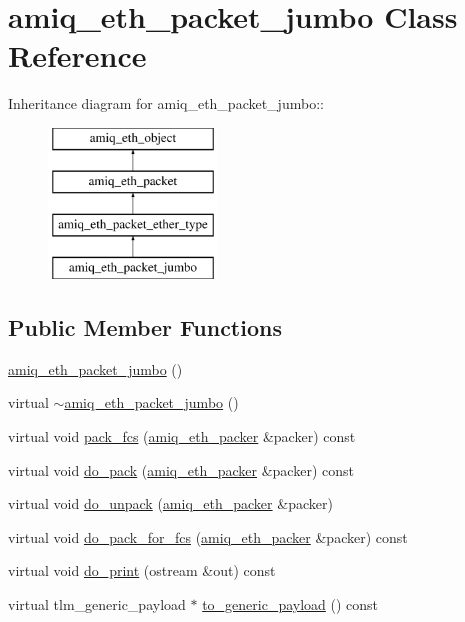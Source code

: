 \hypertarget{classamiq__eth__packet__jumbo}{
\section{amiq\_\-eth\_\-packet\_\-jumbo Class Reference}
\label{classamiq__eth__packet__jumbo}
}
Inheritance diagram for amiq\_\-eth\_\-packet\_\-jumbo::\begin{figure}[H]
\begin{center}
\leavevmode
\includegraphics[height=4cm]{classamiq__eth__packet__jumbo}
\end{center}
\end{figure}
\subsection*{Public Member Functions}
\begin{DoxyCompactItemize}
\item 
\hyperlink{classamiq__eth__packet__jumbo_a860096fdee8dda024573e33010090017}{amiq\_\-eth\_\-packet\_\-jumbo} ()
\item 
virtual \hyperlink{classamiq__eth__packet__jumbo_ad3d4e0fc8070e503c1848e18dd32eabc}{$\sim$amiq\_\-eth\_\-packet\_\-jumbo} ()
\item 
virtual void \hyperlink{classamiq__eth__packet__jumbo_ab53103b74f5b88bd563c647ef28b088e}{pack\_\-fcs} (\hyperlink{classamiq__eth__packer}{amiq\_\-eth\_\-packer} \&packer) const 
\item 
virtual void \hyperlink{classamiq__eth__packet__jumbo_a1f2906c7128a79c356e152368584d2e8}{do\_\-pack} (\hyperlink{classamiq__eth__packer}{amiq\_\-eth\_\-packer} \&packer) const 
\item 
virtual void \hyperlink{classamiq__eth__packet__jumbo_a2d1f1c25847363d774336f8828384635}{do\_\-unpack} (\hyperlink{classamiq__eth__packer}{amiq\_\-eth\_\-packer} \&packer)
\item 
virtual void \hyperlink{classamiq__eth__packet__jumbo_ad1b7057e4292645ccb65b57bcea3a549}{do\_\-pack\_\-for\_\-fcs} (\hyperlink{classamiq__eth__packer}{amiq\_\-eth\_\-packer} \&packer) const 
\item 
virtual void \hyperlink{classamiq__eth__packet__jumbo_a744d47397c29884a7da15e5582b331a2}{do\_\-print} (ostream \&out) const 
\item 
virtual tlm\_\-generic\_\-payload $\ast$ \hyperlink{classamiq__eth__packet__jumbo_a3d838f8920b63ead671eaab21483d74f}{to\_\-generic\_\-payload} () const 
\end{DoxyCompactItemize}

